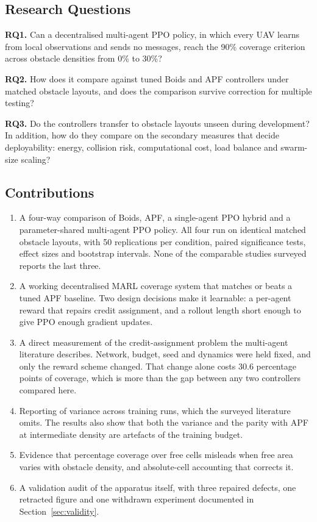 \documentclass[a4paper, 10pt, conference]{ieeeconf}
\begin{document}
\subsection{Research Questions}

\textbf{RQ1.} Can a decentralised multi-agent PPO policy, in which
every UAV learns from local observations and sends no messages, reach
the 90\% coverage criterion across obstacle densities from 0\% to
30\%?

\textbf{RQ2.} How does it compare against tuned Boids and APF
controllers under matched obstacle layouts, and does the comparison
survive correction for multiple testing?

\textbf{RQ3.} Do the controllers transfer to obstacle layouts unseen
during development? In addition, how do they compare on the secondary
measures that decide deployability: energy, collision risk,
computational cost, load balance and swarm-size scaling?

\subsection{Contributions}

\begin{enumerate}
    \item A four-way comparison of Boids, APF, a single-agent PPO
    hybrid and a parameter-shared multi-agent PPO policy. All four run
    on identical matched obstacle layouts, with 50 replications per
    condition, paired significance tests, effect sizes and bootstrap
    intervals. None of the comparable studies surveyed reports the
    last three.
    \item A working decentralised MARL coverage system that matches or
    beats a tuned APF baseline. Two design decisions make it
    learnable: a per-agent reward that repairs credit assignment, and
    a rollout length short enough to give PPO enough gradient updates.
    \item A direct measurement of the credit-assignment problem the
    multi-agent literature describes. Network, budget, seed and
    dynamics were held fixed, and only the reward scheme changed. That
    change alone costs 30.6 percentage points of coverage, which is
    more than the gap between any two controllers compared here.
    \item Reporting of variance across training runs, which the
    surveyed literature omits. The results also show that both the
    variance and the parity with APF at intermediate density are
    artefacts of the training budget.
    \item Evidence that percentage coverage over free cells misleads
    when free area varies with obstacle density, and absolute-cell
    accounting that corrects it.
    \item A validation audit of the apparatus itself, with three
    repaired defects, one retracted figure and one withdrawn
    experiment documented in Section~\ref{sec:validity}.
\end{enumerate}
\end{document}
